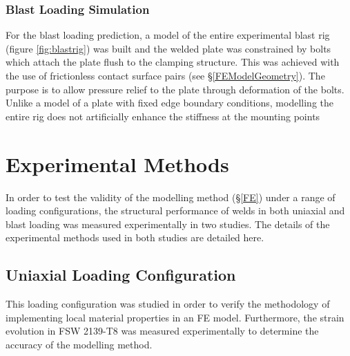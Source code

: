 \subsubsection{Blast Loading Simulation}
For the blast loading prediction, a model of the entire experimental blast rig (figure \ref{fig:blastrig}) was built and the welded plate was constrained by bolts which attach the plate flush to the clamping structure. This was achieved with the use of frictionless contact surface pairs (see \S\ref{FEModelGeometry}). The purpose is to allow pressure relief to the plate through deformation of the bolts. Unlike a model of a plate with fixed edge boundary conditions, modelling the entire rig does not artificially enhance the stiffness at the mounting points

\section{Experimental Methods}
\label{EM}
In order to test the validity of the modelling method (\S\ref{FE}) under a range of loading configurations, the structural performance of welds in both uniaxial and blast loading was measured experimentally in two studies. The details of the experimental methods used in both studies are detailed here.

\subsection{Uniaxial Loading Configuration}
\label{EMUniaxialLoading}
This loading configuration was studied in order to verify the methodology of implementing local material properties in an FE model. Furthermore, the strain evolution in FSW 2139-T8 was measured experimentally to determine the accuracy of the modelling method. 

